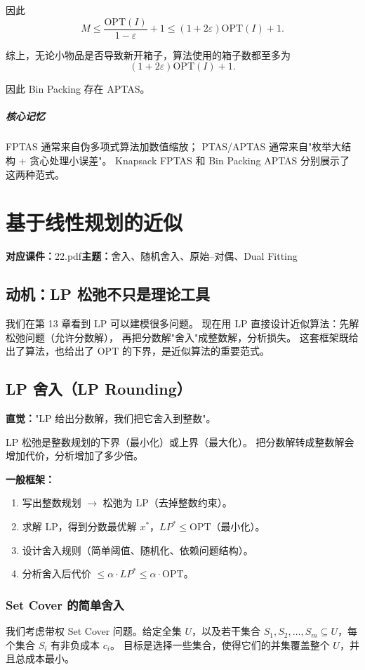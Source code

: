 \documentclass[UTF8,openany,12pt]{ctexbook}
\theoremstyle{remark}
\newcommand{\lecture}[3]{
  \chapter{#2}
  \noindent\textbf{对应课件：}#1\hfill\textbf{主题：}#3
  \vspace{0.6em}
}
\newcommand{\keypoint}[1]{\paragraph{核心记忆}#1}
\newcommand{\OPT}{\mathrm{OPT}}
\begin{document}
因此
\[
  M
  \le \frac{\OPT(I)}{1-\varepsilon}+1
  \le (1+2\varepsilon)\OPT(I)+1.
\]

综上，无论小物品是否导致新开箱子，算法使用的箱子数都至多为
\[
  (1+2\varepsilon)\OPT(I)+1.
\]

因此 Bin Packing 存在 APTAS。

\keypoint{
  FPTAS 通常来自伪多项式算法加数值缩放；
  PTAS/APTAS 通常来自"枚举大结构 + 贪心处理小误差"。
  Knapsack FPTAS 和 Bin Packing APTAS 分别展示了这两种范式。
}

\lecture{22.pdf}{基于线性规划的近似}{舍入、随机舍入、原始--对偶、Dual Fitting}

\section*{动机：LP 松弛不只是理论工具}

我们在第 13 章看到 LP 可以建模很多问题。
现在用 LP 直接设计近似算法：先解松弛问题（允许分数解），
再把分数解"舍入"成整数解，分析损失。
这套框架既给出了算法，也给出了 $\OPT$ 的下界，是近似算法的重要范式。

\section{LP 舍入（LP Rounding）}

\textbf{直觉：}"LP 给出分数解，我们把它舍入到整数"。

LP 松弛是整数规划的下界（最小化）或上界（最大化）。
把分数解转成整数解会增加代价，分析增加了多少倍。

\textbf{一般框架：}
\begin{enumerate}
  \item 写出整数规划 $\to$ 松弛为 LP（去掉整数约束）。
  \item 求解 LP，得到分数最优解 $x^*$，$LP^* \le \OPT$（最小化）。
  \item 设计舍入规则（简单阈值、随机化、依赖问题结构）。
  \item 分析舍入后代价 $\le \alpha \cdot LP^* \le \alpha \cdot \OPT$。
\end{enumerate}

\subsection{Set Cover 的简单舍入}

我们考虑带权 Set Cover 问题。给定全集 $U$，以及若干集合
$S_1,S_2,\dots,S_m \subseteq U$，每个集合 $S_i$ 有非负成本 $c_i$。
目标是选择一些集合，使得它们的并集覆盖整个 $U$，并且总成本最小。
\end{document}
